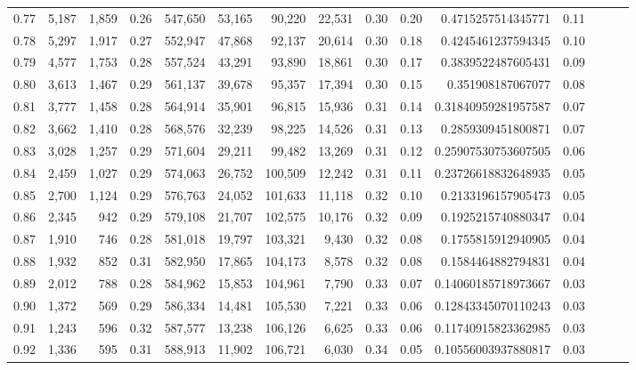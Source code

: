 \begin{tabular}{rrrrrrrrrrrrrrr}
0.77 &   5,187 &  1,859 &  0.26 &  547,650 &   53,165 &   90,220 &   22,531 &  0.30 &  0.20 &   0.4715257514345771 &      0.11 \\
0.78 &   5,297 &  1,917 &  0.27 &  552,947 &   47,868 &   92,137 &   20,614 &  0.30 &  0.18 &   0.4245461237594345 &      0.10 \\
0.79 &   4,577 &  1,753 &  0.28 &  557,524 &   43,291 &   93,890 &   18,861 &  0.30 &  0.17 &   0.3839522487605431 &      0.09 \\
0.80 &   3,613 &  1,467 &  0.29 &  561,137 &   39,678 &   95,357 &   17,394 &  0.30 &  0.15 &    0.351908187067077 &      0.08 \\
0.81 &   3,777 &  1,458 &  0.28 &  564,914 &   35,901 &   96,815 &   15,936 &  0.31 &  0.14 &  0.31840959281957587 &      0.07 \\
0.82 &   3,662 &  1,410 &  0.28 &  568,576 &   32,239 &   98,225 &   14,526 &  0.31 &  0.13 &   0.2859309451800871 &      0.07 \\
0.83 &   3,028 &  1,257 &  0.29 &  571,604 &   29,211 &   99,482 &   13,269 &  0.31 &  0.12 &  0.25907530753607505 &      0.06 \\
0.84 &   2,459 &  1,027 &  0.29 &  574,063 &   26,752 &  100,509 &   12,242 &  0.31 &  0.11 &  0.23726618832648935 &      0.05 \\
0.85 &   2,700 &  1,124 &  0.29 &  576,763 &   24,052 &  101,633 &   11,118 &  0.32 &  0.10 &   0.2133196157905473 &      0.05 \\
0.86 &   2,345 &    942 &  0.29 &  579,108 &   21,707 &  102,575 &   10,176 &  0.32 &  0.09 &   0.1925215740880347 &      0.04 \\
0.87 &   1,910 &    746 &  0.28 &  581,018 &   19,797 &  103,321 &    9,430 &  0.32 &  0.08 &   0.1755815912940905 &      0.04 \\
0.88 &   1,932 &    852 &  0.31 &  582,950 &   17,865 &  104,173 &    8,578 &  0.32 &  0.08 &   0.1584464882794831 &      0.04 \\
0.89 &   2,012 &    788 &  0.28 &  584,962 &   15,853 &  104,961 &    7,790 &  0.33 &  0.07 &  0.14060185718973667 &      0.03 \\
0.90 &   1,372 &    569 &  0.29 &  586,334 &   14,481 &  105,530 &    7,221 &  0.33 &  0.06 &  0.12843345070110243 &      0.03 \\
0.91 &   1,243 &    596 &  0.32 &  587,577 &   13,238 &  106,126 &    6,625 &  0.33 &  0.06 &  0.11740915823362985 &      0.03 \\
0.92 &   1,336 &    595 &  0.31 &  588,913 &   11,902 &  106,721 &    6,030 &  0.34 &  0.05 &  0.10556003937880817 &      0.03 \\

\end{tabular}
